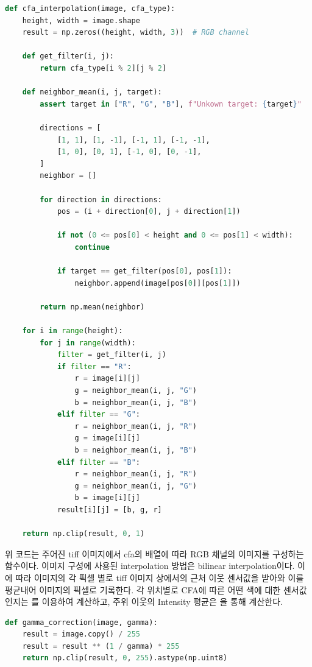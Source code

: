 \documentclass{report}
\begin{document}
\begin{lstlisting}[language=Python, caption=cfa\_interpolation, firstnumber=56]
def cfa_interpolation(image, cfa_type):
    height, width = image.shape
    result = np.zeros((height, width, 3))  # RGB channel

    def get_filter(i, j):
        return cfa_type[i % 2][j % 2]

    def neighbor_mean(i, j, target):
        assert target in ["R", "G", "B"], f"Unkown target: {target}"

        directions = [
            [1, 1], [1, -1], [-1, 1], [-1, -1],
            [1, 0], [0, 1], [-1, 0], [0, -1],
        ]
        neighbor = []

        for direction in directions:
            pos = (i + direction[0], j + direction[1])

            if not (0 <= pos[0] < height and 0 <= pos[1] < width):
                continue

            if target == get_filter(pos[0], pos[1]):
                neighbor.append(image[pos[0]][pos[1]])

        return np.mean(neighbor)

    for i in range(height):
        for j in range(width):
            filter = get_filter(i, j)
            if filter == "R":
                r = image[i][j]
                g = neighbor_mean(i, j, "G")
                b = neighbor_mean(i, j, "B")
            elif filter == "G":
                r = neighbor_mean(i, j, "R")
                g = image[i][j]
                b = neighbor_mean(i, j, "B")
            elif filter == "B":
                r = neighbor_mean(i, j, "R")
                g = neighbor_mean(i, j, "G")
                b = image[i][j]
            result[i][j] = [b, g, r]

    return np.clip(result, 0, 1)
\end{lstlisting}

위 코드는 주어진 tiff 이미지에서 cfa의 배열에 따라 RGB 채널의 이미지를 구성하는 함수이다.
이미지 구성에 사용된 interpolation 방법은 bilinear interpolation이다.
이에 따라 이미지의 각 픽셀 별로 tiff 이미지 상에서의 근처 이웃 센서값을 받아와 이를 평균내어 이미지의 픽셀로 기록한다.
각 위치별로 CFA에 따른 어떤 색에 대한 센서값인지는 를 이용하여 계산하고, 주위 이웃의 Intensity 평균은 을 통해 계산한다.

\begin{lstlisting}[language=Python, caption=gamma\_correction, firstnumber=118]
def gamma_correction(image, gamma):
    result = image.copy() / 255
    result = result ** (1 / gamma) * 255
    return np.clip(result, 0, 255).astype(np.uint8)
\end{lstlisting}
\end{document}
